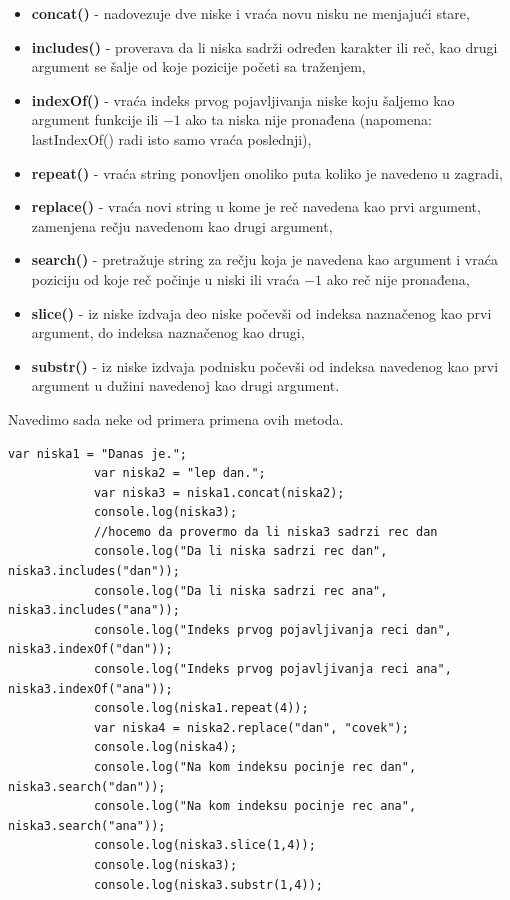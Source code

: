 \documentclass[a4paper]{article}
\begin{document}
\begin{itemize}
    \item \textbf{concat()} - nadovezuje dve niske i vraća novu nisku ne menjajući stare,
    \item \textbf{includes()} - proverava da li niska sadrži određen karakter ili reč, kao drugi argument se šalje od koje pozicije početi sa traženjem,  
    \item \textbf{indexOf()} - vraća indeks prvog pojavljivanja niske koju šaljemo kao argument funkcije ili $-1$ ako ta niska nije pronađena (napomena: lastIndexOf() radi isto samo vraća poslednji), 
    \item \textbf{repeat()} - vraća string ponovljen onoliko puta koliko je navedeno u zagradi, 
    \item \textbf{replace()} - vraća novi string u kome je reč navedena kao prvi argument, zamenjena rečju navedenom kao drugi argument, 
    \item \textbf{search()} - pretražuje string za rečju koja je navedena kao argument i vraća poziciju od koje reč počinje u niski ili vraća $-1$ ako reč nije pronađena,  
    \item \textbf{slice()} - iz niske izdvaja deo niske počevši od indeksa naznačenog kao prvi argument, do indeksa naznačenog kao drugi, 
    \item \textbf{substr()} - iz niske izdvaja podnisku počevši od indeksa navedenog kao prvi argument u dužini navedenoj kao drugi argument.
\end{itemize}

Navedimo sada neke od primera primena ovih metoda.
\begin{verbatim}
var niska1 = "Danas je.";
    		var niska2 = "lep dan.";
    		var niska3 = niska1.concat(niska2);
    		console.log(niska3);
    		//hocemo da provermo da li niska3 sadrzi rec dan
    		console.log("Da li niska sadrzi rec dan", niska3.includes("dan"));
    		console.log("Da li niska sadrzi rec ana", niska3.includes("ana"));
    		console.log("Indeks prvog pojavljivanja reci dan", niska3.indexOf("dan"));
    		console.log("Indeks prvog pojavljivanja reci ana", niska3.indexOf("ana"));
    		console.log(niska1.repeat(4));
    		var niska4 = niska2.replace("dan", "covek");
    		console.log(niska4);
    		console.log("Na kom indeksu pocinje rec dan", niska3.search("dan"));
    		console.log("Na kom indeksu pocinje rec ana", niska3.search("ana"));
    		console.log(niska3.slice(1,4));
    		console.log(niska3);
    		console.log(niska3.substr(1,4));    
\end{verbatim}
\end{document}
